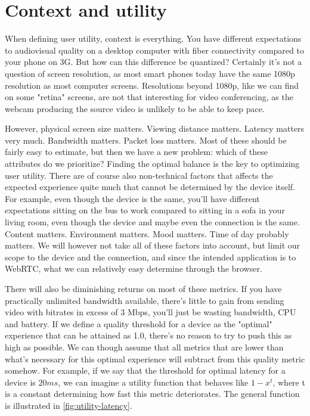 \section{Context and utility}

When defining user utility, context is everything. You have different expectations to audiovisual quality on a desktop computer with fiber connectivity compared to your phone on 3G. But how can this difference be quantized? Certainly it's not a question of screen resolution, as most smart phones today have the same 1080p resolution as most computer screens. Resolutions beyond 1080p, like we can find on some "retina" screens, are not that interesting for video conferencing, as the webcam producing the source video is unlikely to be able to keep pace.

However, physical screen size matters. Viewing distance matters. Latency matters very much. Bandwidth matters. Packet loss matters. Most of these should be fairly easy to estimate, but then we have a new problem: which of these attributes do we prioritize? Finding the optimal balance is the key to optimizing user utility. There are of course also non-technical factors that affects the expected experience quite much that cannot be determined by the device itself. For example, even though the device is the same, you'll have different expectations sitting on the bus to work compared to sitting in a sofa in your living room, even though the device and maybe even the connection is the same. Content matters. Environment matters. Mood matters. Time of day probably matters. We will however not take all of these factors into account, but limit our scope to the device and the connection, and since the intended application is to WebRTC, what we can relatively easy determine through the browser.

There will also be diminishing returns on most of these metrics. If you have practically unlimited bandwidth available, there's little to gain from sending video with bitrates in excess of 3 Mbps, you'll just be wasting bandwidth, CPU and battery. If we define a quality threshold for a device as the "optimal" experience that can be attained as 1.0, there's no reason to try to push this as high as possible. We can though assume that all metrics that are lower than what's necessary for this optimal experience will subtract from this quality metric somehow. For example, if we say that the threshold for optimal latency for a device is \(20ms\), we can imagine a \gls{utility function} that behaves like \(1 - x^t\), where t is a constant determining how fast this metric deteriorates. The general function is illustrated in \autoref{fig:utility-latency}.


